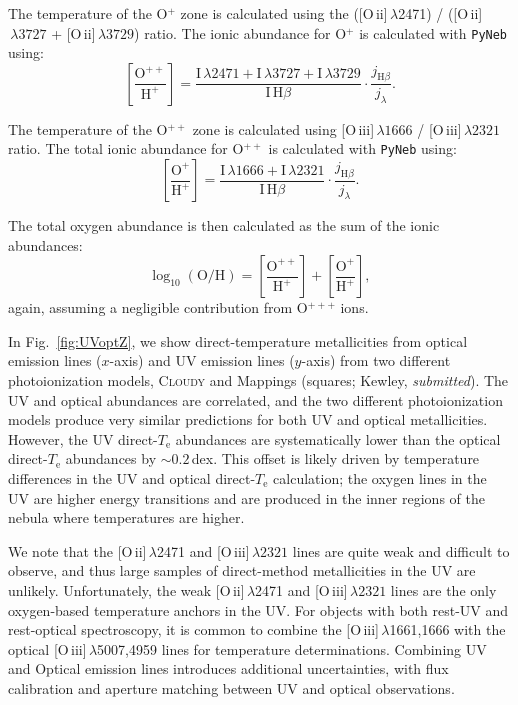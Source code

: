 \documentclass[preprint2]{aastex62}
\newcommand{\Cloudy}{\textsc{Cloudy}\xspace}
\newcommand{\oiii}{[O\,{\sc iii}]\xspace}
\newcommand{\oii}{[O\,{\sc ii}]\xspace}
\newcommand{\Te}{\ensuremath{T_{\mathrm{e}}}\xspace}
\begin{document}
The temperature of the O$^{+}$ zone is calculated using the (\oii$\,\lambda$2471) / (\oii$\,\lambda 3727$ + \oii$\,\lambda 3729$) ratio. The ionic abundance for O$^{+}$ is calculated with {\tt PyNeb} using:
\begin{equation}
    \left[ \frac{\mathrm{O}^{++}}{\mathrm{H}^{+}} \right] = \frac{\mathrm{I}\,\lambda 2471 +\mathrm{I}\,\lambda 3727 + \mathrm{I}\,\lambda 3729}{\mathrm{I}\,\mathrm{H}\beta} \cdot \frac{j_{\mathrm{H}\beta}}{j_{\lambda}}.
\end{equation}

The temperature of the O$^{++}$ zone is calculated using \oiii$\,\lambda1666$ / \oiii$\,\lambda2321$ ratio. The total ionic abundance for O$^{++}$ is calculated with {\tt PyNeb} using:
\begin{equation}
    \left[ \frac{\mathrm{O}^{+}}{\mathrm{H}^{+}} \right] = \frac{\mathrm{I}\,\lambda 1666 +\mathrm{I}\,\lambda 2321}{\mathrm{I}\,\mathrm{H}\beta} \cdot \frac{j_{\mathrm{H}\beta}}{j_{\lambda}}.
\end{equation}

The total oxygen abundance is then calculated as the sum of the ionic abundances:
\begin{equation}
    \log_{10}(\mathrm{O}/\mathrm{H}) = \left[ \frac{\mathrm{O}^{++}}{\mathrm{H}^{+}} \right] + \left[ \frac{\mathrm{O}^{+}}{\mathrm{H}^{+}} \right],
\end{equation}
again, assuming a negligible contribution from O$^{+++}$ ions.

In Fig.~\ref{fig:UVoptZ}, we show direct-temperature metallicities from optical emission lines ($x$-axis) and UV emission lines ($y$-axis) from two different photoionization models, \Cloudy \citep[circles;][]{Byler+2018} and {\sc Mappings} (squares; Kewley, \emph{submitted}). The UV and optical abundances are correlated, and the two different photoionization models produce very similar predictions for both UV and optical metallicities. However, the UV direct-\Te abundances are systematically lower than the optical direct-\Te abundances by $\sim0.2$\,dex. This offset is likely driven by temperature differences in the UV and optical direct-\Te calculation; the oxygen lines in the UV are higher energy transitions and are produced in the inner regions of the nebula where temperatures are higher.

We note that the \oii$\,\lambda$2471 and \oiii$\,\lambda2321$ lines are quite weak and difficult to observe, and thus large samples of direct-method metallicities in the UV are unlikely. Unfortunately, the weak \oii$\,\lambda$2471 and \oiii$\,\lambda2321$ lines are the only oxygen-based temperature anchors in the UV. For objects with both rest-UV and rest-optical spectroscopy, it is common to combine the \oiii$\,\lambda$1661,1666 with the optical \oiii$\,\lambda$5007,4959 lines for temperature determinations. Combining UV and Optical emission lines introduces additional uncertainties, with flux calibration and aperture matching between UV and optical observations.
\end{document}
